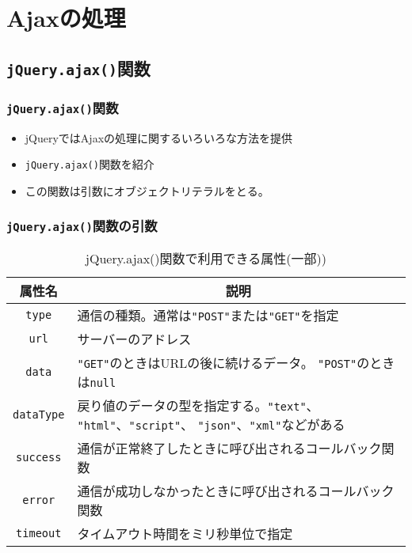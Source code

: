 \section{Ajaxの処理}
\subsection{\texttt{jQuery.ajax()}関数}
\begin{frame}[containsverbatim]
 \frametitle{\texttt{jQuery.ajax()}関数}
 \begin{itemize}
  \item jQueryではAjaxの処理に関するいろいろな方法を提供
  \item \texttt{jQuery.ajax()}関数を紹介
  \item この関数は引数にオブジェクトリテラルをとる。
 \end{itemize}
\end{frame}
\begin{frame}[containsverbatim]
 \frametitle{\texttt{jQuery.ajax()}関数の引数}
 \begin{table}[ht]
 \caption{jQuery.ajax()関数で利用できる属性(一部))}\label{jQueryAjax}
\begin{center}
 \begin{tabular}{|c|m{}|}\hline
属性名  &\multicolumn{1}{c|}{説明} \\\hline
  \texttt{type}&通信の種類。通常は\texttt{"POST"}または\texttt{"GET"}を指定\\
  \hline
  \texttt{url}&サーバーのアドレス\\ \hline
  \texttt{data}&\texttt{"GET"}のときはURLの後に続けるデータ。
      \texttt{"POST"}のときは\texttt{null}\\ \hline
  \texttt{dataType}&戻り値のデータの型を指定する。\texttt{"text"}、
      \texttt{"html"}、\texttt{"script"}、      
\texttt{"json"}、\texttt{"xml"}などがある\\ \hline
\texttt{success}&通信が正常終了したときに呼び出されるコールバック関数
      \\ \hline
\texttt{error}&通信が成功しなかったときに呼び出されるコールバック関数
      \\ \hline
  \texttt{timeout}&タイムアウト時間をミリ秒単位で指定\\ \hline
 \end{tabular}
\end{center}
\end{table}
\end{frame}
